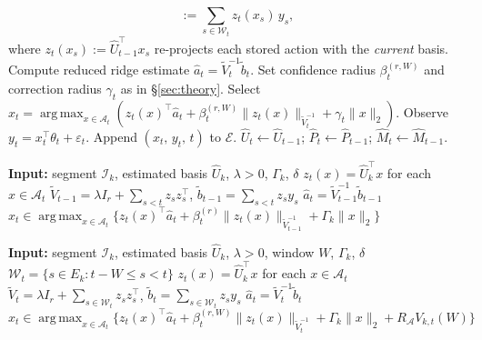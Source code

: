 \documentclass{article}
\newcommand{\cA}{\mathcal{A}}
\newcommand{\cI}{\mathcal{I}}
\DeclareMathOperator*{\argmax}{arg\,max}
\begin{document}
\begin{algorithm}[t]
\begin{algorithmic}[1]
\[              :=
              \sum_{s\in\mathcal W_t}
                z_t(x_s)\, y_s,
          \]
          where $z_t(x_s) := \widehat U_{t-1}^\top x_s$
          re-projects each stored action with the \emph{current} basis.
          \State Compute reduced ridge estimate $\widehat a_t = \widetilde V_t^{-1}\widetilde b_t$.
          \State Set confidence radius $\beta_t^{(r,W)}$ and correction radius $\gamma_t$
                 as in \S\ref{sec:theory}.
          \State Select
          $x_t
              =
              \argmax_{x \in \cA_t}
              \!\left(
              z_t(x)^\top \widehat a_t
              +
              \beta_t^{(r,W)} \|z_t(x)\|_{\widetilde V_t^{-1}}
              +
              \gamma_t \|x\|_2
              \right)$.
          \State Observe $y_t = x_t^\top \theta_t + \varepsilon_t$.
          \State Append $(x_t,\, y_t,\, t)$ to $\mathcal{E}$.
          \State $\widehat U_t \leftarrow \widehat U_{t-1}$;\;
                 $\widehat P_t \leftarrow \widehat P_{t-1}$;\;
                 $\widehat M_t \leftarrow \widehat M_{t-1}$.
      \EndIf
  \EndFor
  \end{algorithmic}
\end{algorithm}
\begin{algorithm}[!htpb]
\caption{Segmentwise projected ridge-UCB in the learned subspace}
\label{alg:segment_projected_ofu}
\begin{algorithmic}[1]
\State \textbf{Input:} segment $\cI_k$, estimated basis $\widehat U_k$, $\lambda>0$, $\Gamma_k$, $\delta$
    \State $z_t(x)=\widehat U_k^\top x$ for each $x \in \cA_t$
    \State $\widetilde V_{t-1} = \lambda I_r + \sum_{s<t} z_s z_s^\top$, \; $\widetilde b_{t-1} = \sum_{s<t} z_s y_s$
    \State $\widehat a_t = \widetilde V_{t-1}^{-1}\widetilde b_{t-1}$
    \State $x_t \in \argmax_{x\in \cA_t}\{z_t(x)^\top \widehat a_t + \beta_t^{(r)}\|z_t(x)\|_{\widetilde V_{t-1}^{-1}} + \Gamma_k\|x\|_2\}$
\EndFor
\end{algorithmic}
\end{algorithm}

\begin{algorithm}[!htpb]
\caption{Windowed projected ridge-UCB in the learned subspace}
\label{alg:windowed_projected_ofu}
\begin{algorithmic}[1]
\State \textbf{Input:} segment $\cI_k$, estimated basis $\widehat U_k$, $\lambda>0$, window $W$, $\Gamma_k$, $\delta$
    \State $\mathcal W_t = \{s\in E_k : t-W \le s < t\}$
    \State $z_t(x)=\widehat U_k^\top x$ for each $x \in \cA_t$
    \State $\widetilde V_t = \lambda I_r + \sum_{s\in \mathcal W_t} z_s z_s^\top$, \; $\widetilde b_t = \sum_{s\in \mathcal W_t} z_s y_s$
    \State $\widehat a_t = \widetilde V_t^{-1}\widetilde b_t$
    \State $x_t \in \argmax_{x\in \cA_t}\{z_t(x)^\top \widehat a_t + \beta_t^{(r,W)}\|z_t(x)\|_{\widetilde V_t^{-1}} + \Gamma_k\|x\|_2 + R_{\cA}V_{k,t}(W)\}$
\EndFor
\end{algorithmic}
\end{algorithm}
\end{document}
